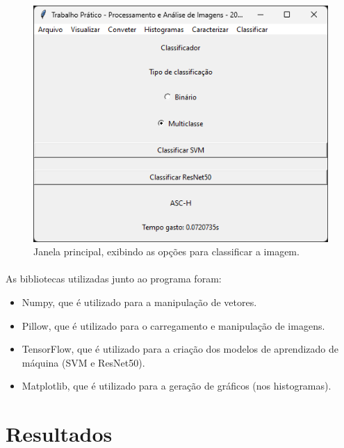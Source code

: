 \documentclass[12pt]{article}
\begin{document}
\begin{figure}
    \centering
    \includegraphics{Captura de tela 2024-06-16 120712.png}
    \caption{Janela principal, exibindo as opções para classificar a imagem.}
    \label{fig:janela-principal-classificar-imagem}
\end{figure}

\paragraph{}As bibliotecas utilizadas junto ao programa foram:

\begin{itemize}
    \item Numpy, que é utilizado para a manipulação de vetores.
    
    \item Pillow, que é utilizado para o carregamento e manipulação de imagens.
    
    \item TensorFlow, que é utilizado para a criação dos modelos de aprendizado de máquina (SVM e ResNet50).

    \item Matplotlib, que é utilizado para a geração de gráficos (nos histogramas).
\end{itemize}

\section{Resultados}
\end{document}
